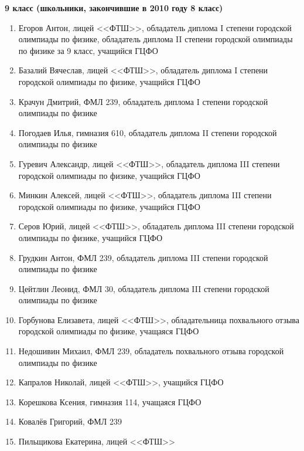 \textbf{9 класс (школьники, закончившие в 2010 году 8 класс)}
\begin{enumerate}
\item Егоров Антон, лицей <<ФТШ>>, обладатель диплома I степени городской олимпиады по физике, обладатель диплома II степени городской олимпиады по физике за 9 класс, учащийся ГЦФО
\item Базалий Вячеслав, лицей <<ФТШ>>, обладатель диплома I степени городской олимпиады по физике, учащийся ГЦФО
\item Крачун Дмитрий, ФМЛ 239, обладатель диплома I степени городской олимпиады по физике
\item Погодаев Илья, гимназия 610, обладатель диплома II степени городской олимпиады по физике
\item Гуревич Александр, лицей <<ФТШ>>, обладатель диплома III степени городской олимпиады по физике, учащийся ГЦФО
\item Минкин Алексей, лицей <<ФТШ>>, обладатель диплома III степени городской олимпиады по физике, учащийся ГЦФО
\item Серов Юрий, лицей <<ФТШ>>, обладатель диплома III степени городской олимпиады по физике, учащийся ГЦФО
\item Грудкин Антон, ФМЛ 239, обладатель диплома III степени городской олимпиады по физике
\item Цейтлин Леонид, ФМЛ 30, обладатель диплома III степени городской олимпиады по физике
\item Горбунова Елизавета, лицей <<ФТШ>>, обладательница похвального отзыва городской олимпиады по физике, учащаяся ГЦФО
\item Недошивин Михаил, ФМЛ 239, обладатель похвального отзыва городской олимпиады по физике
\item Капралов Николай, лицей <<ФТШ>>, учащийся ГЦФО
\item Корешкова Ксения, гимназия 114, учащаяся ГЦФО
\item Ковалёв Григорий, ФМЛ 239
\item Пильщикова Екатерина, лицей <<ФТШ>>
\end{enumerate}

